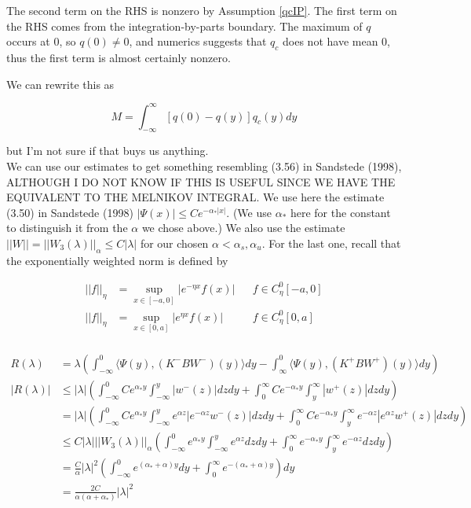 \documentclass[12pt]{article}
\begin{document}
The second term on the RHS is nonzero by Assumption \ref{qcIP}. The first term on the RHS comes from the integration-by-parts boundary. The maximum of $q$ occurs at 0, so $q(0) \neq 0$, and numerics suggests that $q_c$ does not have mean 0, thus the first term is almost certainly nonzero.

We can rewrite this as

\begin{equation}
M = \int_{-\infty}^\infty [q(0) - q(y)] q_c(y) dy
\end{equation}

but I'm not sure if that buys us anything.\\

We can use our estimates to get something resembling (3.56) in Sandstede (1998), ALTHOUGH I DO NOT KNOW IF THIS IS USEFUL SINCE WE HAVE THE EQUIVALENT TO THE MELNIKOV INTEGRAL. We use here the estimate (3.50) in Sandstede (1998) $|\Psi(x)| \leq C e^{-\alpha_* |x|}$. (We use $\alpha_*$ here for the constant to distinguish it from the $\alpha$ we chose above.) We also use the estimate $||W|| = ||W_3(\lambda)||_\alpha \leq C|\lambda|$ for our chosen $\alpha < \alpha_s, \alpha_u$. For the last one, recall that the exponentially weighted norm is defined by

\begin{align*}
|| f ||_\eta &= \sup_{x \in [-a, 0]} |e^{-\eta x} f(x) | && f \in C^0_\eta[-a, 0] \\
|| f ||_\eta &= \sup_{x \in [0, a]} |e^{\eta x} f(x) | && f \in C^0_\eta[0, a] \\
\end{align*}

\begin{align*}
R(\lambda) &= \lambda\left( \int_{-\infty}^0 \langle \Psi(y), (K^- B W^-)(y) \rangle dy - \int_\infty^0 \langle \Psi(y), (K^+ B W^+)(y) \rangle dy \right) \\
|R(\lambda)| &\leq |\lambda|\left( \int_{-\infty}^0 C e^{\alpha_* y} \int_{-\infty}^y |w^-(z)| dz dy + \int_0^\infty C e^{-\alpha_* y} \int_y^\infty |w^+(z)| dz dy \right) \\
&= |\lambda|\left( \int_{-\infty}^0 C e^{\alpha_* y} \int_{-\infty}^y e^{\alpha z} |e^{-\alpha z} w^-(z)| dz dy + \int_0^\infty C e^{-\alpha_* y} \int_y^\infty e^{-\alpha z} |e^{\alpha z}w^+(z)| dz dy \right)\\
&\leq C |\lambda| ||W_3(\lambda)||_\alpha \left( \int_{-\infty}^0 e^{\alpha_* y} \int_{-\infty}^y e^{\alpha z} dz dy + \int_0^\infty e^{-\alpha_* y} \int_y^\infty e^{-\alpha z} dz dy \right)\\
&= \frac{C}{\alpha} |\lambda|^2 \left( \int_{-\infty}^0 e^{(\alpha_* + \alpha) y} dy + \int_0^\infty e^{-(\alpha_* + \alpha) y} \right) dy \\
&= \frac{2 C}{\alpha(\alpha + \alpha_*)} |\lambda|^2 
\end{align*}
\end{document}
